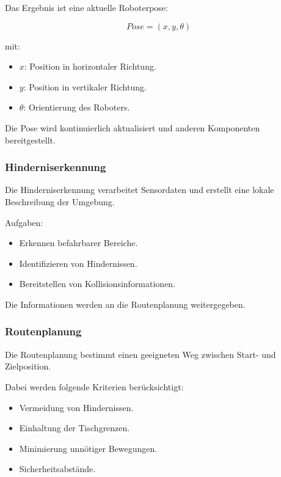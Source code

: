 Das Ergebnis ist eine aktuelle Roboterpose:

\[
Pose = (x, y, \theta)
\]

mit:

\begin{itemize}
\tightlist
\item
  \(x\): Position in horizontaler Richtung.
\item
  \(y\): Position in vertikaler Richtung.
\item
  \(\theta\): Orientierung des Roboters.
\end{itemize}

Die Pose wird kontinuierlich aktualisiert und anderen Komponenten
bereitgestellt.

\subsubsection{Hinderniserkennung}\label{hinderniserkennung-1}

Die Hinderniserkennung verarbeitet Sensordaten und erstellt eine lokale
Beschreibung der Umgebung.

Aufgaben:

\begin{itemize}
\tightlist
\item
  Erkennen befahrbarer Bereiche.
\item
  Identifizieren von Hindernissen.
\item
  Bereitstellen von Kollisionsinformationen.
\end{itemize}

Die Informationen werden an die Routenplanung weitergegeben.

\subsubsection{Routenplanung}\label{routenplanung}

Die Routenplanung bestimmt einen geeigneten Weg zwischen Start- und
Zielposition.

Dabei werden folgende Kriterien berücksichtigt:

\begin{itemize}
\tightlist
\item
  Vermeidung von Hindernissen.
\item
  Einhaltung der Tischgrenzen.
\item
  Minimierung unnötiger Bewegungen.
\item
  Sicherheitsabstände.
\end{itemize}

